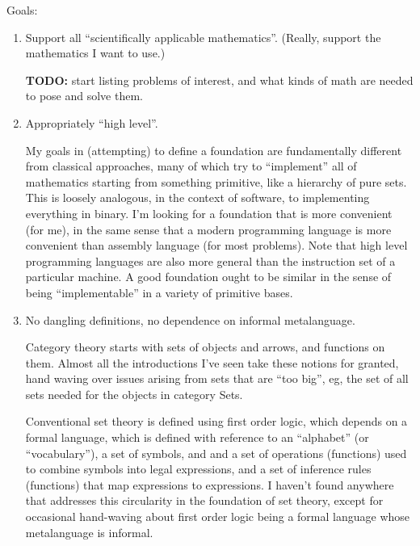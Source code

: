 \documentclass[11pt,openany]{book}
\begin{document}
Goals:
\begin{enumerate}
  \item Support all ``scientifically applicable mathematics''.
  (Really, support the mathematics I want to use.) \par
  \textbf{TODO:} start listing problems of interest,
  and what kinds of math are needed to pose and solve them.
  
  \item Appropriately ``high level''. \par
  My goals in (attempting) to define a foundation are fundamentally
different from classical approaches,
many of which try to ``implement'' all of mathematics starting from
something primitive, like a hierarchy of pure sets.
This is loosely analogous, in the context of software,
to implementing everything in binary.
I'm looking for a foundation that is more convenient (for me),
in the same sense that a modern programming language is more
convenient than assembly language (for most problems).
Note that high level programming languages are also more general
than the instruction set of a particular machine.
A good foundation ought to be similar in the sense of being
``implementable'' in a variety of primitive bases.

  \item No dangling definitions, no dependence on informal metalanguage.
   \par
  Category theory starts with sets of objects and arrows, 
  and functions on them. Almost all the introductions I've seen 
  take these notions for granted, hand waving over issues arising
  from sets that are ``too big'', eg, the set of all sets needed
  for the objects in category Sets.
  \par
  Conventional set theory is defined using first order logic,
  which depends on a formal language, which is defined with
  reference to an ``alphabet'' (or ``vocabulary''), 
  a set of symbols, and and a set of
  operations (functions) used to combine symbols into legal 
  expressions, and a set of inference rules (functions) that map
  expressions to expressions. I haven't found anywhere that
  addresses this circularity in the foundation of set theory,
  except for occasional hand-waving about first order logic
  being a formal language whose metalanguage is informal.
  

\end{enumerate}
\end{document}
